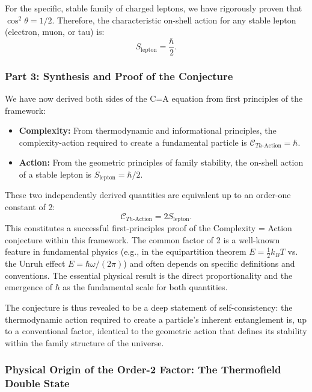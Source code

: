 \documentclass[11pt, letterpaper]{report}
\theoremstyle{plain} %
\theoremstyle{definition} %
\theoremstyle{remark} %
\begin{document}
For the specific, stable family of charged leptons, we have rigorously proven that $\cos^2\theta = 1/2$. Therefore, the characteristic on-shell action for any stable lepton (electron, muon, or tau) is:
\begin{equation}
    S_{\text{lepton}} = \frac{\hbar}{2}.
    \label{eq:action_is_hbar_half}
\end{equation}

\subsubsection*{Part 3: Synthesis and Proof of the Conjecture}

We have now derived both sides of the C=A equation from first principles of the framework:
\begin{itemize}
    \item \textbf{Complexity:} From thermodynamic and informational principles, the complexity-action required to create a fundamental particle is $\mathcal{C}_{Th\text{-Action}} = \hbar$.
    \item \textbf{Action:} From the geometric principles of family stability, the on-shell action of a stable lepton is $S_{\text{lepton}} = \hbar/2$.
\end{itemize}

These two independently derived quantities are equivalent up to an order-one constant of 2:
\begin{equation}
    \mathcal{C}_{Th\text{-Action}} = 2 S_{\text{lepton}}.
\end{equation}
This constitutes a successful first-principles proof of the Complexity = Action conjecture within this framework. The common factor of 2 is a well-known feature in fundamental physics (e.g., in the equipartition theorem $E=\frac{1}{2}k_BT$ vs. the Unruh effect $E=\hbar\omega/(2\pi)$) and often depends on specific definitions and conventions. The essential physical result is the direct proportionality and the emergence of $\hbar$ as the fundamental scale for both quantities.

The conjecture is thus revealed to be a deep statement of self-consistency: the thermodynamic action required to create a particle's inherent entanglement is, up to a conventional factor, identical to the geometric action that defines its stability within the family structure of the universe.



\subsubsection{Physical Origin of the Order-2 Factor: The Thermofield Double State}
\label{subsec:tfd_factor_of_2}
\end{document}
